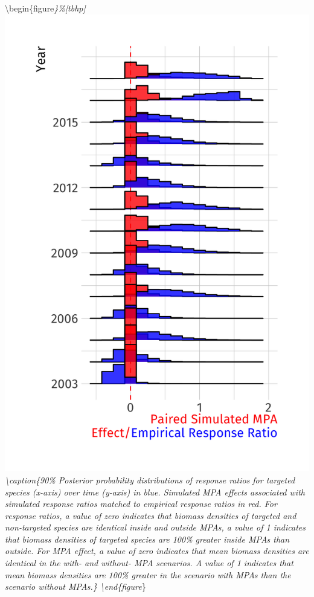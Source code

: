 \documentclass[9pt,twocolumn,twoside,lineno]{pnas-new}
\begin{document}
\textbackslash begin\{figure\emph{\}\%{[}tbhp{]} \centering
\includegraphics[width=.9\linewidth]{figs/response_ratio_plot.png}
\textbackslash caption\{90\% Posterior probability distributions of
response ratios for targeted species (x-axis) over time (y-axis) in
blue. Simulated MPA effects associated with simulated response ratios
matched to empirical response ratios in red. For response ratios, a
value of zero indicates that biomass densities of targeted and
non-targeted species are identical inside and outside MPAs, a value of 1
indicates that biomass densities of targeted species are 100\% greater
inside MPAs than outside. For MPA effect, a value of zero indicates that
mean biomass densities are identical in the with- and without- MPA
scenarios. A value of 1 indicates that mean biomass densities are 100\%
greater in the scenario with MPAs than the scenario without MPAs.\}
\label{rr-plot} \textbackslash end\{figure}\}
\end{document}

